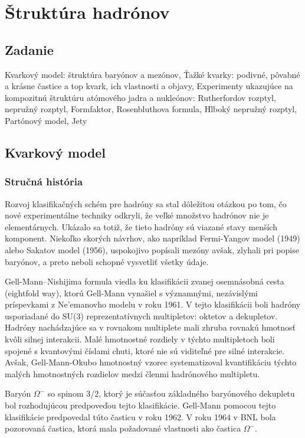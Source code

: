 \documentclass[../../main.tex]{subfiles}
\begin{document}
\chapter{Štruktúra hadrónov}

\section{Zadanie}
Kvarkový model: štruktúra baryónov a mezónov, Ťažké kvarky: podivné, pôvabné a krásne častice a top kvark, ich vlastnosti a objavy, Experimenty ukazujúce na kompozitnú štruktúru atómového jadra a nukleónov: Rutherfordov rozptyl, nepružný rozptyl, Formfaktor, Rosenbluthova formula, Hlboký nepružný rozptyl, Partónový model, Jety 

\section{Kvarkový model}
\subsection{Stručná história}
Rozvoj klasifikačných schém pre hadróny sa stal dôležitou otázkou po tom, čo nové experimentálne techniky odkryli, že veľké množstvo hadrónov nie je  elementárnych. Ukázalo sa totiž, že tieto hadróny sú viazané stavy menších komponent. Niekoľko skorých návrhov, ako napríklad Fermi-Yangov model (1949) alebo Sakatov model (1956), uspokojivo popísali mezóny avšak, zlyhali pri popise baryónov, a preto neboli schopné vysvetliť všetky údaje.

Gell-Mann–Nishijima formula viedla ku klasifikácii zvanej osemnásobná cesta (eightfold way), ktorú Gell-Mann vynašiel s významnými, nezávislými príspevkami z Ne'emanovho modelu v roku 1961. V tejto klasifikácii boli hadróny usporiadané do SU(3) reprezentatívnych multipletov: oktetov a dekupletov. Hadróny nachádzajúce sa v rovnakom multiplete mali zhruba rovnakú hmotnosť kvôli silnej interakcii. Malé hmotnostné rozdiely v týchto multipletoch boli spojené s kvantovými číslami chuti, ktoré nie sú viditeľné pre silné interakcie. Avšak, Gell-Mann-Okubo hmotnostný vzorec systematizoval kvantifikáciu týchto malých hmotnostných rozdielov medzi členmi hadrónového multipletu.

Baryón $\Omega^{-}$ so spinom 3/2, ktorý je súčasťou základného baryónového dekupletu bol rozhodujúcou predpoveďou tejto klasifikácie. Gell-Mann pomocou tejto klasifikácie predpovedal túto časticu v roku 1962. V roku 1964 v BNL bola pozorovaná častica, ktorá mala požadované vlastnosti ako častica $\Omega^{-}$.
\end{document}

